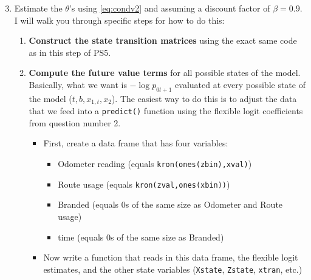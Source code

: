 \documentclass[12pt,english]{article}
\begin{document}
\begin{enumerate}
\setcounter{enumi}{2}
\item Estimate the $\theta$'s using \eqref{eq:condv2} and assuming a discount factor of $\beta = 0.9$. I will walk you through specific steps for how to do this:
    \begin{enumerate}
        \item \textbf{Construct the state transition matrices} using the exact same code as in this step of PS5.
        
        \item \textbf{Compute the future value terms} for all possible states of the model. Basically, what we want is $-\log p_{0t+1}$ evaluated at every possible state of the model ($t,b,x_{1,t},x_2$). The easiest way to do this is to adjust the data that we feed into a \texttt{predict()} function using the flexible logit coefficients from question number 2.
        \begin{itemize}
            \item First, create a data frame that has four variables:
            \begin{itemize}
                \item Odometer reading (equals \texttt{kron(ones(zbin),xval)})
                \item Route usage (equals \texttt{kron(zval,ones(xbin))})
                \item Branded (equals 0s of the same size as Odometer and Route usage)
                \item time (equals 0s of the same size as Branded)
            \end{itemize}
            
            \item Now write a function that reads in this data frame, the flexible logit estimates, and the other state variables (\texttt{Xstate}, \texttt{Zstate}, \texttt{xtran}, etc.)
            

\end{itemize}
\end{enumerate}
\end{enumerate}
\end{document}
